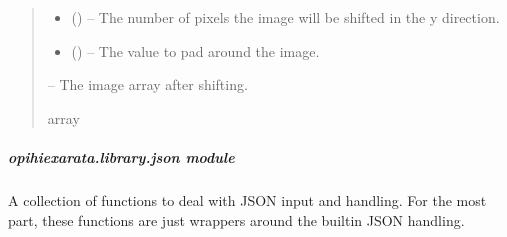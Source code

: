 \documentclass[letterpaper,11pt,english]{sphinxmanual}
\begin{document}
\begin{savenotes}
\begin{fulllineitems}
\begin{quote}
\begin{description}
\begin{itemize}
\item {} 
\sphinxAtStartPar
{} (\sphinxstyleliteralemphasis{\sphinxupquote{, }}) – The number of pixels the image will be shifted in the y direction.

\item {} 
\sphinxAtStartPar
{} (\sphinxstyleliteralemphasis{\sphinxupquote{, }}) – The value to pad around the image.

\end{itemize}

\sphinxAtStartPar
{} – The image array after shifting.

\sphinxAtStartPar
array

\end{description}\end{quote}

\end{fulllineitems}\end{savenotes}


\sphinxstepscope


\subparagraph{opihiexarata.library.json module}
\label{\detokenize{code/opihiexarata.library.json:module-opihiexarata.library.json}}\label{\detokenize{code/opihiexarata.library.json:opihiexarata-library-json-module}}\label{\detokenize{code/opihiexarata.library.json::doc}}
\sphinxAtStartPar
A collection of functions to deal with JSON input and handling. For the
most part, these functions are just wrappers around the built\sphinxhyphen{}in JSON handling.
\end{document}
